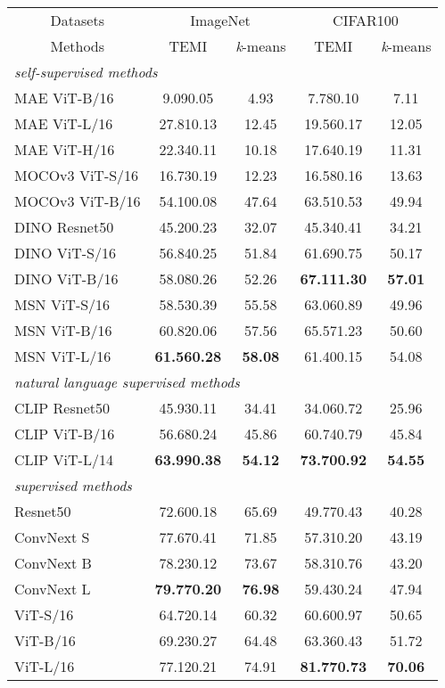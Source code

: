 \documentclass{bmvc2k}
\begin{document}
\begin{table}[h]
\begin{center}
\begin{tabular}{lcccc}
			\toprule
			\multicolumn{1}{c}{Datasets} & \multicolumn{2}{c}{ImageNet} &     \multicolumn{2}{c}{CIFAR100}  \\
			\cmidrule{1-2} \cmidrule{3-5}    
   \multicolumn{1}{c}{Methods} &  TEMI  & \textit{k}-means  &       TEMI  & \textit{k}-means  \\
				\hline
		\multicolumn{5}{l}{\textit{self-supervised methods}}\\		
      MAE ViT-B/16    & 9.090.05 & 4.93 & 7.780.10 & 7.11 \\
    MAE ViT-L/16    & 27.810.13 & 12.45 & 19.560.17 & 12.05 \\
    MAE ViT-H/16    & 22.340.11 & 10.18 & 17.640.19 & 11.31 \\
 \hline
     MOCOv3 ViT-S/16 & 16.730.19 & 12.23 & 16.580.16 & 13.63 \\
    MOCOv3 ViT-B/16 & 54.100.08 & 47.64 & 63.510.53 & 49.94 \\
 \hline
	DINO Resnet50   & 45.200.23  & 32.07 & 45.340.41 & 34.21  \\
	DINO ViT-S/16   & 56.840.25 & 51.84  & 61.690.75 &  50.17 \\
	DINO ViT-B/16   & 58.080.26 & 52.26  & \textbf{67.111.30} & \textbf{57.01} \\
 \hline

    MSN ViT-S/16    & 58.530.39 & 55.58  & 63.060.89 & 49.96 \\
    MSN ViT-B/16    & 60.820.06 & 57.56  & 65.571.23 & 50.60 \\
    MSN ViT-L/16    & \textbf{61.560.28} & \textbf{58.08}  & 61.400.15 & 54.08 \\
 \hline
  \hline
  \multicolumn{5}{l}{\textit{natural language supervised methods}}\\
    CLIP Resnet50   & 45.930.11 & 34.41 & 34.060.72 & 25.96  \\ 
	CLIP ViT-B/16   & 56.680.24 & 45.86 & 60.740.79 & 45.84 \\ 
	CLIP ViT-L/14   & \textbf{63.990.38} & \textbf{54.12} & \textbf{73.700.92} & \textbf{54.55} \\
 \hline
  \hline
  \multicolumn{5}{l}{\textit{supervised methods}}\\	
   Resnet50   & 72.600.18 & 65.69 & 49.770.43 & 40.28 \\
    ConvNext S      & 77.670.41 & 71.85 & 57.310.20 & 43.19\\
   ConvNext B      & 78.230.12 & 73.67 & 58.310.76 & 43.20 \\
    ConvNext L      & \textbf{79.770.20} & \textbf{76.98} & 59.430.24 & 47.94 \\
   ViT-S/16   & 64.720.14 & 60.32 & 60.600.97 & 50.65 \\ 
	 ViT-B/16   & 69.230.27 & 64.48 & 63.360.43 & 51.72 \\
	ViT-L/16   & 77.120.21 & 74.91 & \textbf{81.770.73} & \textbf{70.06} \\


\end{tabular}
\end{center}
\end{table}
\end{document}
